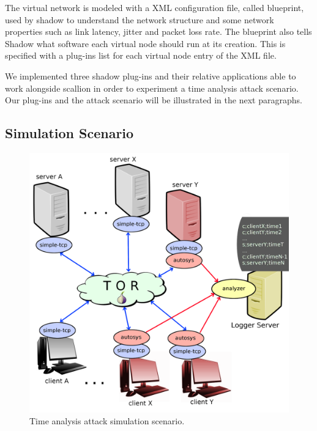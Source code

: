 The virtual network is modeled with a XML configuration
file, called blueprint, used by shadow to understand the network
structure and some network properties such as link latency, jitter and
packet loss rate. The blueprint also tells Shadow what software each
virtual node should run at its creation. This is specified with a
plug-ins list for each virtual node entry of the XML file.

We implemented three shadow plug-ins and their relative applications 
 able to work alongside scallion in
order to experiment a time analysis attack scenario. Our plug-ins and
the attack scenario will be illustrated in the next paragraphs.

\subsection{Simulation Scenario}
\begin{figure}[H]
    \centering
    \includegraphics[scale=0.33]{scenario.png}
    \caption{Time analysis attack simulation scenario.}
    \label{fig:scenario}
\end{figure}

